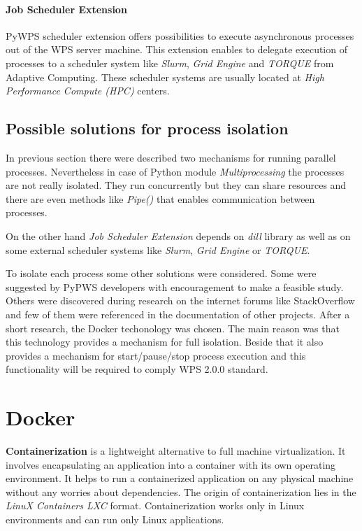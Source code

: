 \documentclass{gifce}
\begin{document}
\paragraph{Job Scheduler Extension}
PyWPS scheduler extension offers possibilities to execute asynchronous processes out of the WPS server machine.
This extension enables to delegate execution of processes to a scheduler system like \textit{Slurm}, \textit{Grid Engine} 
and \textit{TORQUE} from Adaptive Computing. These scheduler systems are usually located at \textit{High Performance Compute (HPC)}
centers.

\subsection{Possible solutions for process isolation}
In previous section there were described two mechanisms for running parallel processes. Nevertheless in case of Python module
\textit{Multiprocessing} the processes are not really isolated. They run concurrently but they can share resources and there are 
even methods like \textit{Pipe()} that enables communication between processes.

On the other hand \textit{Job Scheduler Extension} depends on
\textit{dill} library as well as on some external scheduler systems
like \textit{Slurm}, \textit{Grid Engine} or \textit{TORQUE}.

\bigskip
To isolate each process some other solutions were considered. 
Some were suggested by PyPWS developers with encouragement to make a feasible study. Others were discovered
during research on the internet forums like StackOverflow and few of
them were referenced in the documentation of other projects. After a short research, the Docker techonology
was chosen. The main reason was that this technology provides a mechanism for full isolation. Beside that
it also provides a mechanism for start/pause/stop process execution and this functionality
will be required to comply WPS 2.0.0 standard.

\section{Docker}
\textbf{Containerization} is a lightweight alternative to full machine virtualization. It involves encapsulating an application 
into a container with its own operating environment. It helps to run a containerized application on any physical machine without any
worries about dependencies. The origin of containerization lies in the \textit{LinuX Containers {LXC}} format. Containerization works only in Linux environments and can run only Linux applications.
\end{document}
